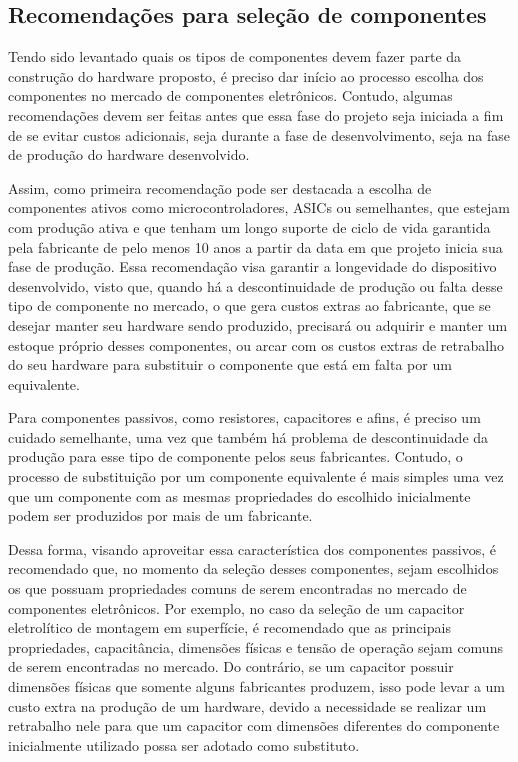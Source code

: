 \subsection{Recomendações para seleção de componentes}\label{subsec:recomendacoes_componentes}

Tendo sido levantado quais os tipos de componentes devem fazer parte da construção do hardware proposto, é preciso dar início ao processo escolha dos componentes no mercado de componentes eletrônicos. Contudo, algumas recomendações devem ser feitas antes que essa fase do projeto seja iniciada a fim de se evitar custos adicionais, seja durante a fase de desenvolvimento, seja na fase de produção do hardware desenvolvido. 

Assim, como primeira recomendação pode ser destacada a escolha de componentes ativos como microcontroladores, \gls{ASIC}s ou semelhantes, que estejam com produção ativa e que tenham um longo suporte de ciclo de vida garantida pela fabricante de pelo menos 10 anos a partir da data em que projeto inicia sua fase de produção. Essa recomendação visa garantir a longevidade do dispositivo desenvolvido, visto que, quando há a descontinuidade de produção ou falta desse tipo de componente no mercado, o que gera custos extras ao fabricante, que se desejar manter seu hardware sendo produzido, precisará ou adquirir e manter um estoque próprio desses componentes, ou arcar com os custos extras de retrabalho do seu hardware para substituir o componente que está em falta por um equivalente. 

Para componentes passivos, como resistores, capacitores e afins, é preciso um cuidado semelhante, uma vez que também há problema de descontinuidade da produção para esse tipo de componente pelos seus fabricantes. Contudo, o processo de substituição por um componente equivalente é mais simples uma vez que um componente com as mesmas propriedades do escolhido inicialmente podem ser produzidos por mais de um fabricante. 

Dessa forma, visando aproveitar essa característica dos componentes passivos, é recomendado que, no momento da seleção desses componentes, sejam escolhidos os que possuam propriedades comuns de serem encontradas no mercado de componentes eletrônicos. Por exemplo, no caso da seleção de um capacitor eletrolítico de montagem em superfície, é recomendado que as principais propriedades, capacitância, dimensões físicas e tensão de operação sejam comuns de serem encontradas no mercado. Do contrário, se um capacitor possuir dimensões físicas que somente alguns fabricantes produzem, isso pode levar a um custo extra na produção de um hardware, devido a necessidade se realizar um retrabalho nele para que um capacitor com dimensões diferentes do componente inicialmente utilizado possa ser adotado como substituto. 

